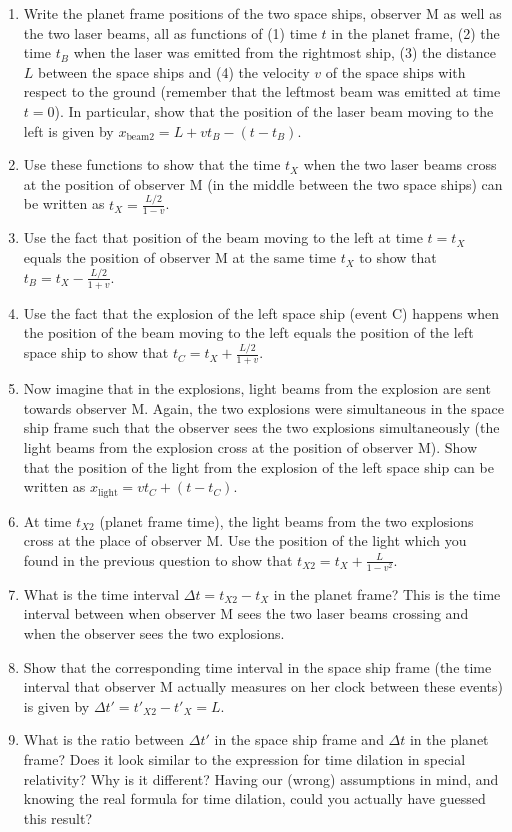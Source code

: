 {\begin{multicols}{2}
\begin{enumerate}
\item Write the planet frame positions of the two space ships,
observer M as well as the two laser beams, all as functions of (1) time $t$ in the planet frame, (2) the time $t_B$ when the laser was emitted from the rightmost ship, (3) the distance $L$ between the space ships and (4) the velocity $v$ of the space ships with respect to the ground (remember that the leftmost beam was emitted at time $t=0$). In particular, show that the position of the laser beam moving to the left is given by $x_\mathrm{beam2}=L+vt_B-(t-t_B)$.
\item Use these functions to show that the time $t_X$ when the two
laser beams cross at the position of observer M (in the middle between the two space ships) can be written as $t_X=\frac{L/2}{1-v}$.
\item Use the fact that position of the beam moving to the left at
time $t=t_X$ equals the position of observer M at the same time $t_X$ to show that $t_B=t_X-\frac{L/2}{1+v}$.
\item Use the fact that the explosion of the left space ship (event C) happens when the position of the beam moving to the left equals the position of the left space ship to show that $t_C=t_X+\frac{L/2}{1+v}$.
\item Now imagine that in the explosions, light beams from the
explosion are sent towards observer M. Again, the two explosions were
simultaneous in the space ship frame such that the observer sees the
two explosions simultaneously (the light beams from the explosion
cross at the position of observer M). Show that the position of the light from the explosion of the left space ship can be written as $x_\mathrm{light}=vt_C+(t-t_C)$.
\item At time $t_{X2}$ (planet frame time), the light beams from the
two explosions cross at the place of observer M. Use the position of the light which you found in the previous question to show that $t_{X2}=t_X+\frac{L}{1-v^2}$.
\item What is the time interval $\Delta t=t_{X2}-t_X$ in the planet frame? This is the time interval between when observer M sees the two laser beams crossing and when the observer sees the two explosions.
\item Show that the corresponding time interval in the space ship
frame (the time interval that observer M actually measures on her clock between these events) is given by $\Delta t'=t'_{X2}-t'_{X}=L$.
\item What is the ratio between $\Delta t'$ in the space ship frame and $\Delta t$ in the planet frame? Does it look similar to the expression for time dilation in special relativity? Why is it different? Having our (wrong) assumptions in mind, and knowing the real formula for time dilation, could you actually have guessed this result?
\end{enumerate}





\end{multicols}}
